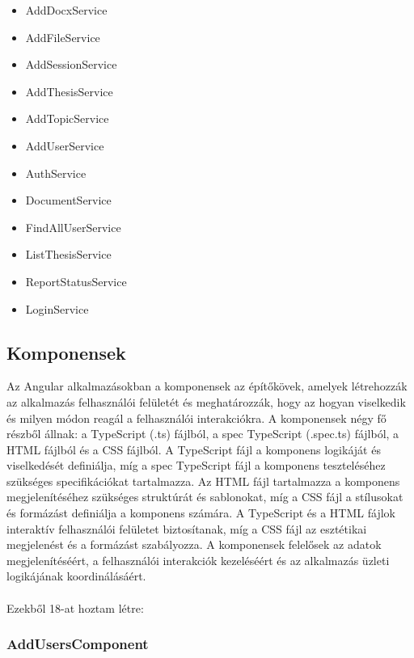 \begin{itemize}

\item{AddDocxService}
\item{AddFileService}
\item{AddSessionService}
\item{AddThesisService}
\item{AddTopicService}
\item{AddUserService}
\item{AuthService}
\item{DocumentService}
\item{FindAllUserService}
\item{ListThesisService}
\item{ReportStatusService}
\item{LoginService}

\end{itemize}


\subsection{Komponensek}

Az Angular alkalmazásokban a komponensek az építőkövek, amelyek létrehozzák az alkalmazás felhasználói felületét és meghatározzák, hogy az hogyan viselkedik és milyen módon reagál a felhasználói interakciókra. A komponensek négy fő részből állnak: a TypeScript (.ts) fájlból, a spec TypeScript (.spec.ts) fájlból, a HTML fájlból és a CSS fájlból. A TypeScript fájl a komponens logikáját és viselkedését definiálja, míg a spec TypeScript fájl a komponens teszteléséhez szükséges specifikációkat tartalmazza. Az HTML fájl tartalmazza a komponens megjelenítéséhez szükséges struktúrát és sablonokat, míg a CSS fájl a stílusokat és formázást definiálja a komponens számára. A TypeScript és a HTML fájlok interaktív felhasználói felületet biztosítanak, míg a CSS fájl az esztétikai megjelenést és a formázást szabályozza. A komponensek felelősek az adatok megjelenítéséért, a felhasználói interakciók kezeléséért és az alkalmazás üzleti logikájának koordinálásáért.\\
\\
Ezekből 18-at hoztam létre:

\subsubsection{AddUsersComponent}

